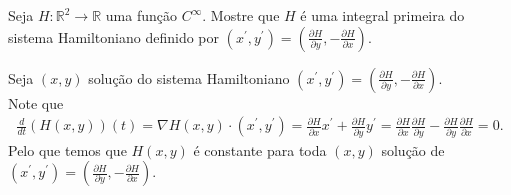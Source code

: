 \begin{homeworkProblem}[6]
  Seja $H:\mathbb{R}^2\to\mathbb{R}$ uma função $C^\infty$. Mostre que $H$ é uma integral primeira do sistema Hamiltoniano definido por $(x^{\prime},y^{\prime})=\left(\frac{\partial H}{\partial y}, -\frac{\partial H}{\partial x}\right)$.
  \begin{solution}
    Seja $(x,y)$ solução do sistema Hamiltoniano $(x^{\prime},y^{\prime})=\left( \frac{\partial H}{\partial y},-\frac{\partial H}{\partial x} \right)$.\\
    Note que
    \begin{align*}
      \frac{d}{dt}\left( H(x,y) \right)(t)=\nabla H(x,y)\cdot (x^{\prime},y^{\prime})=\frac{\partial H}{\partial x}x^{\prime}+\frac{\partial H}{\partial y}y^{\prime}=\frac{\partial H}{\partial x}\frac{\partial H}{\partial y}-\frac{\partial H}{\partial y}\frac{\partial H}{\partial x}=0.
    \end{align*}
    Pelo que temos que $H(x,y)$ é constante para toda $(x,y)$ solução de $(x^{\prime},y^{\prime})=\left( \frac{\partial H}{\partial y},-\frac{\partial H}{\partial x} \right)$.
  \end{solution}
\end{homeworkProblem}
